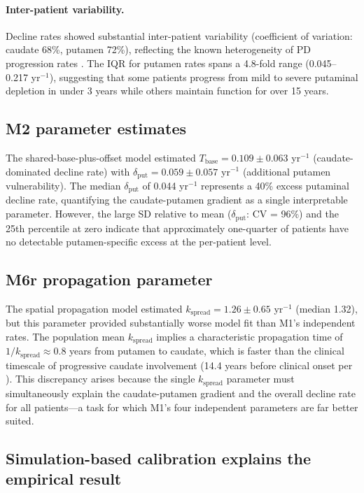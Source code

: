 \paragraph{Inter-patient variability.} Decline rates showed substantial inter-patient variability (coefficient of variation: caudate 68\%, putamen 72\%), reflecting the known heterogeneity of PD progression rates \cite{simuni2024}. The IQR for putamen rates spans a 4.8-fold range (0.045--0.217 yr$^{-1}$), suggesting that some patients progress from mild to severe putaminal depletion in under 3 years while others maintain function for over 15 years.

\subsection{M2 parameter estimates}

The shared-base-plus-offset model estimated $T_{\text{base}} = 0.109 \pm 0.063$ yr$^{-1}$ (caudate-dominated decline rate) with $\delta_{\text{put}} = 0.059 \pm 0.057$ yr$^{-1}$ (additional putamen vulnerability). The median $\delta_{\text{put}}$ of 0.044 yr$^{-1}$ represents a 40\% excess putaminal decline rate, quantifying the caudate-putamen gradient as a single interpretable parameter. However, the large SD relative to mean ($\delta_{\text{put}}$: CV = 96\%) and the 25th percentile at zero indicate that approximately one-quarter of patients have no detectable putamen-specific excess at the per-patient level.

\subsection{M6r propagation parameter}

The spatial propagation model estimated $k_{\text{spread}} = 1.26 \pm 0.65$ yr$^{-1}$ (median 1.32), but this parameter provided substantially worse model fit than M1's independent rates. The population mean $k_{\text{spread}}$ implies a characteristic propagation time of $1/k_{\text{spread}} \approx 0.8$ years from putamen to caudate, which is faster than the clinical timescale of progressive caudate involvement (14.4 years before clinical onset per \cite{kim2022}). This discrepancy arises because the single $k_{\text{spread}}$ parameter must simultaneously explain the caudate-putamen gradient and the overall decline rate for all patients---a task for which M1's four independent parameters are far better suited.

\subsection{Simulation-based calibration explains the empirical result}


